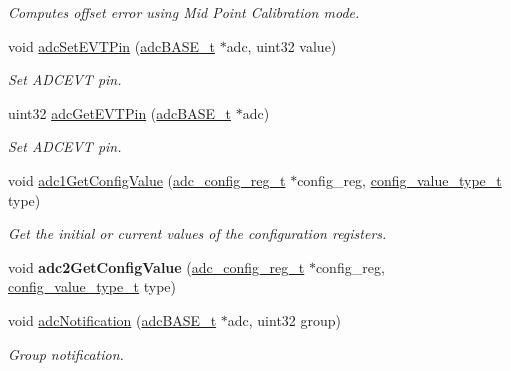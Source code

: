 \begin{DoxyCompactItemize}
\begin{DoxyCompactList}\small\item\em Computes offset error using Mid Point Calibration mode. \end{DoxyCompactList}\item 
void \mbox{\hyperlink{group__ADC_gaa8ea6657a9cd07f73ec82876d014c203}{adc\+Set\+E\+V\+T\+Pin}} (\mbox{\hyperlink{reg__adc_8h_ab98b3b090eb1fd96596cd337a5fc0a4e}{adc\+B\+A\+S\+E\+\_\+t}} $\ast$adc, uint32 value)
\begin{DoxyCompactList}\small\item\em Set A\+D\+C\+E\+VT pin. \end{DoxyCompactList}\item 
uint32 \mbox{\hyperlink{group__ADC_ga0e44b7ecaee5bf23d1653da2ac80fe33}{adc\+Get\+E\+V\+T\+Pin}} (\mbox{\hyperlink{reg__adc_8h_ab98b3b090eb1fd96596cd337a5fc0a4e}{adc\+B\+A\+S\+E\+\_\+t}} $\ast$adc)
\begin{DoxyCompactList}\small\item\em Set A\+D\+C\+E\+VT pin. \end{DoxyCompactList}\item 
void \mbox{\hyperlink{group__ADC_ga919d1c45d7b1bdab5eb226dddad5a428}{adc1\+Get\+Config\+Value}} (\mbox{\hyperlink{structadc__config__reg}{adc\+\_\+config\+\_\+reg\+\_\+t}} $\ast$config\+\_\+reg, \mbox{\hyperlink{sys__common_8h_a9daf9a5992391b058477d28d107ee5e2}{config\+\_\+value\+\_\+type\+\_\+t}} type)
\begin{DoxyCompactList}\small\item\em Get the initial or current values of the configuration registers. \end{DoxyCompactList}\item 
\mbox{\label{group__ADC_ga58461e613185bd4b68cd92e7e7d25ec1}} 
void {\bfseries adc2\+Get\+Config\+Value} (\mbox{\hyperlink{structadc__config__reg}{adc\+\_\+config\+\_\+reg\+\_\+t}} $\ast$config\+\_\+reg, \mbox{\hyperlink{sys__common_8h_a9daf9a5992391b058477d28d107ee5e2}{config\+\_\+value\+\_\+type\+\_\+t}} type)
\item 
void \mbox{\hyperlink{group__ADC_ga753cd0a8988b0b7b5044cfc3cfb3298d}{adc\+Notification}} (\mbox{\hyperlink{reg__adc_8h_ab98b3b090eb1fd96596cd337a5fc0a4e}{adc\+B\+A\+S\+E\+\_\+t}} $\ast$adc, uint32 group)
\begin{DoxyCompactList}\small\item\em Group notification. \end{DoxyCompactList}\end{DoxyCompactItemize}


